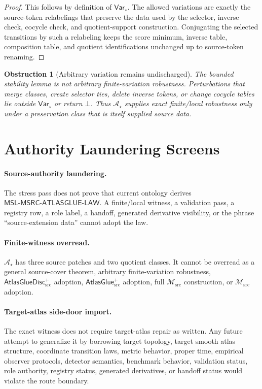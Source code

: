\documentclass[11pt]{article}
\newcommand{\Msrc}{\mathcal{M}_{\mathrm{src}}}
\newcommand{\AtlasGlue}{\mathsf{AtlasGlue}_{\mathrm{src}}^{+}}
\newcommand{\AtlasGlueDisc}{\mathsf{AtlasGlueDisc}_{\mathrm{src}}^{+}}
\newcommand{\MSL}{\mathsf{MSL}\mbox{-}\mathsf{MSRC}\mbox{-}\mathsf{ATLASGLUE}\mbox{-}\mathsf{LAW}}
\newcommand{\Bot}{\bot}
\newcommand{\Astar}{\mathcal A_{\star}}
\newcommand{\Varstar}{\mathsf{Var}_{\star}}
\newtheorem{obstruction}{Obstruction}
\begin{document}
\begin{proof}
This follows by definition of \(\Varstar\). The allowed variations are exactly
the source-token relabelings that preserve the data used by the selector,
inverse check, cocycle check, and quotient-support construction. Conjugating
the selected transitions by such a relabeling keeps the score minimum,
inverse table, composition table, and quotient identifications unchanged up
to source-token renaming.
\end{proof}

\begin{obstruction}[Arbitrary variation remains undischarged]
The bounded stability lemma is not arbitrary finite-variation robustness.
Perturbations that merge classes, create selector ties, delete inverse tokens,
or change cocycle tables lie outside \(\Varstar\) or return \(\Bot\). Thus
\(\Astar\) supplies exact finite/local robustness only under a preservation
class that is itself supplied source data.
\end{obstruction}

\section{Authority Laundering Screens}

\paragraph{Source-authority laundering.}
The stress pass does not prove that current ontology derives \(\MSL\). A
finite/local witness, a validation pass, a registry row, a role label, a
handoff, generated derivative visibility, or the phrase ``source-extension
data'' cannot adopt the law.

\paragraph{Finite-witness overread.}
\(\Astar\) has three source patches and two quotient classes. It cannot be
overread as a general source-cover theorem, arbitrary finite-variation
robustness, \(\AtlasGlueDisc\) adoption, \(\AtlasGlue\) adoption, full
\(\Msrc\) construction, or \(\Msrc\) adoption.

\paragraph{Target-atlas side-door import.}
The exact witness does not require target-atlas repair as written. Any future
attempt to generalize it by borrowing target topology, target smooth atlas
structure, coordinate transition laws, metric behavior, proper time,
empirical observer protocols, detector semantics, benchmark behavior,
validation status, role authority, registry status, generated derivatives, or
handoff status would violate the route boundary.
\end{document}
